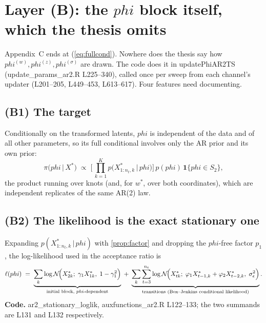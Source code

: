 \documentclass[11pt]{article}
\newcommand{\bphi}{\boldsymbol{\varphi}}
\newcommand{\ind}{\mathbf{1}}
\newcommand{\Norm}{\mathcal{N}}
\newcommand{\given}{\,\vert\,}
\DeclareRobustCommand{\code}[1]{\texttt{#1}}
\newcommand{\eref}[1]{(\ref{#1})}
\def\bphi{phi}%
\def\boldsymbol#1{#1}%
\def\bm#1{#1}%
\def\code#1{#1}%
\theoremstyle{plain}
\theoremstyle{definition}
\theoremstyle{remark}
\begin{document}
\section{Layer (B): the $\bphi$ block itself, which the thesis omits}
\label{sec:layerB}

Appendix~C ends at \eref{eq:fullcond}. Nowhere does the thesis say how
$\bphi^{(w)}, \bphi^{(z)}, \bphi^{(\sigma)}$ are drawn. The code does it in
\code{updatePhiAR2TS} (\code{update\_params\_ar2.R} L225--340), called once
per sweep from each channel's updater (L201--205, L449--453, L613--617). Four
features need documenting.

\subsection{(B1) The target}

Conditionally on the transformed latents, $\bphi$ is independent of the data
and of all other parameters, so its full conditional involves only the AR
prior and its own prior:
\begin{equation}\label{eq:phi-target}
  \pi\bigl(\bphi \given X^{*}\bigr)
  \;\propto\;
  \Biggl[\, \prod_{k=1}^{K} p\bigl(X^{*}_{1:n_t,k} \given \bphi\bigr) \Biggr]\, p(\bphi)\, \ind\{\bphi \in S_2\},
\end{equation}
the product running over knots (and, for $\bm{w}^{*}$, over both coordinates),
which are independent replicates of the same AR(2) law.

\subsection{(B2) The likelihood is the exact stationary one}

Expanding $p(X^{*}_{1:n_t,k} \given \bphi)$ with \cref{prop:factor} and
dropping the $\bphi$-free factor $p_1$, the log-likelihood used in the
acceptance ratio is
\begin{equation}\label{eq:exact-ll}
  \ell(\bphi)
  \;=\;
  \underbrace{\sum_{k} \log \Norm\!\Bigl(X^{*}_{2k};\; \gamma_1 X^{*}_{1k},\; 1 - \gamma_1^2 \Bigr)}_{\text{initial block, } \bphi\text{-dependent}}
  \;+\;
  \underbrace{\sum_{k} \sum_{t=3}^{n_t} \log \Norm\!\Bigl(X^{*}_{tk};\; \varphi_1 X^{*}_{t-1,k} + \varphi_2 X^{*}_{t-2,k},\; \sigma_\epsilon^2 \Bigr)}_{\text{transitions (Box--Jenkins conditional likelihood)}} .
\end{equation}
\textbf{Code.} \code{ar2\_stationary\_loglik}, \code{auxfunctions\_ar2.R}
L122--133; the two summands are L131 and L132 respectively.
\end{document}
